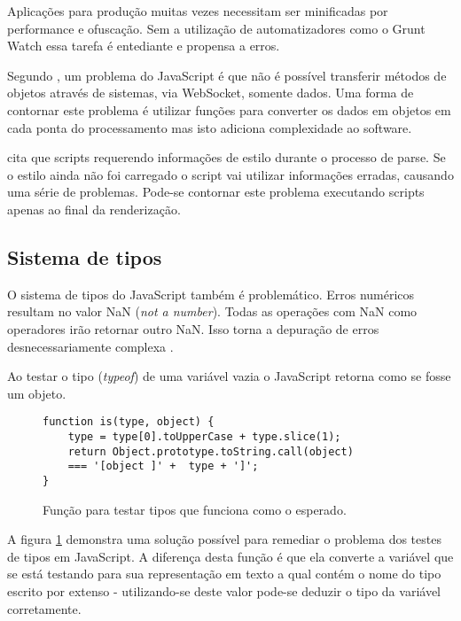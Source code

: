Aplicações para produção muitas vezes necessitam ser minificadas por
performance e ofuscação. Sem a utilização de automatizadores como o
Grunt Watch essa tarefa é entediante e propensa a erros.

Segundo \cite{htmlResearchJournal}, um problema do JavaScript é que
não é possível transferir métodos de objetos através de sistemas,
via WebSocket, somente dados. Uma forma de contornar este problema é
utilizar funções para converter os dados em objetos em cada ponta do
processamento mas isto adiciona complexidade ao software.

\cite{howBrowsersWork} cita que scripts requerendo informações de
estilo durante o processo de parse. Se o estilo ainda não foi carregado
o script vai utilizar informações erradas, causando uma série de
problemas. Pode-se contornar este problema executando scripts apenas 
ao final da renderização.

\subsection{Sistema de tipos}

O sistema de tipos do JavaScript também é problemático.
Erros numéricos resultam no valor NaN (\textit{not a number}).
Todas as operações com NaN como operadores irão retornar outro
NaN. Isso torna a depuração de erros desnecessariamente complexa
\autocite{html5mostwanted}.

Ao testar o tipo (\textit{typeof}) de uma variável vazia o JavaScript
retorna como se fosse um objeto.

\begin{figure}[H]
\centering
\begin{verbatim}
function is(type, object) {
    type = type[0].toUpperCase + type.slice(1);
    return Object.prototype.toString.call(object)
    === '[object ]' +  type + ']';
}
\end{verbatim}
\caption{Função para testar tipos que funciona como o esperado.}
\label{fig:fixJSTypes}
\end{figure}

A figura \ref{fig:fixJSTypes} demonstra uma solução possível para
remediar o problema dos testes de tipos em JavaScript. A diferença
desta função é que ela converte a variável que se está testando
para sua representação em texto a qual contém o nome do tipo escrito
por extenso - utilizando-se deste valor pode-se deduzir o tipo da
variável corretamente.

